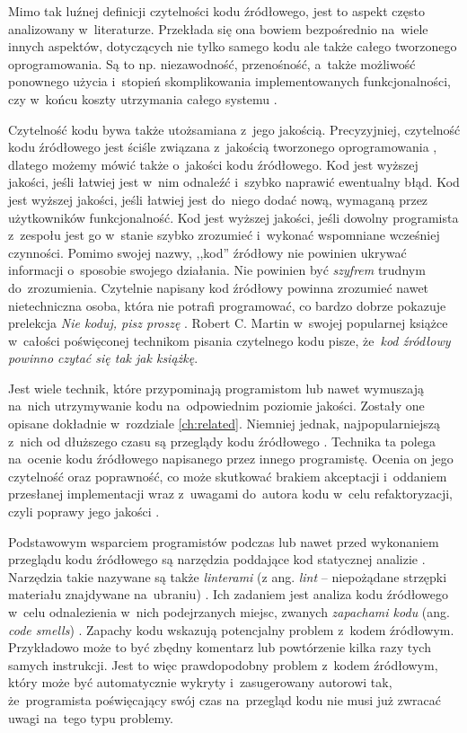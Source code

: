 \documentclass[twoside]{praca}
\begin{document}
Mimo tak luźnej definicji czytelności kodu źródłowego, jest to aspekt często analizowany w~literaturze. Przekłada się ona bowiem bezpośrednio na~wiele innych aspektów, dotyczących nie tylko samego kodu ale także całego tworzonego oprogramowania. Są to np. niezawodność, przenośność, a~także możliwość ponownego użycia i~stopień skomplikowania implementowanych funkcjonalności, czy w~końcu koszty utrzymania całego systemu \cite{collar2006role, tashtoush2013impact}.

Czytelność kodu bywa także utożsamiana z~jego jakością. Precyzyjniej, czytelność kodu źródłowego jest ściśle związana z~jakością tworzonego oprogramowania \cite{buse2010learning}, dlatego możemy mówić także o~jakości kodu źródłowego. Kod jest wyższej jakości, jeśli łatwiej jest w~nim odnaleźć i~szybko naprawić ewentualny błąd. Kod jest wyższej jakości, jeśli łatwiej jest do~niego dodać nową, wymaganą przez użytkowników funkcjonalność. Kod jest wyższej jakości, jeśli dowolny programista z~zespołu jest go w~stanie szybko zrozumieć i~wykonać wspomniane wcześniej czynności. Pomimo swojej nazwy, ,,kod'' źródłowy nie powinien ukrywać informacji o~sposobie swojego działania. Nie powinien być \textit{szyfrem} trudnym do~zrozumienia. Czytelnie napisany kod źródłowy powinna zrozumieć nawet nietechniczna osoba, która nie potrafi programować, co bardzo dobrze pokazuje prelekcja \textit{Nie koduj, pisz proszę} \cite{sobotka:koduj}. Robert C. Martin w~swojej popularnej książce w~całości poświęconej technikom pisania czytelnego kodu \cite{martin2009clean} pisze, że~\textit{kod źródłowy powinno czytać się tak jak książkę}.

Jest wiele technik, które przypominają programistom lub nawet wymuszają na~nich utrzymywanie kodu na~odpowiednim poziomie jakości. Zostały one opisane dokładnie w~rozdziale \ref{ch:related}. Niemniej jednak, najpopularniejszą z~nich od dłuższego czasu są przeglądy kodu źródłowego \cite{beller2014modern}. Technika ta polega na~ocenie kodu źródłowego napisanego przez innego programistę. Ocenia on jego czytelność oraz poprawność, co może skutkować brakiem akceptacji i~oddaniem przesłanej implementacji wraz z~uwagami do~autora kodu w~celu refaktoryzacji, czyli poprawy jego jakości \cite{fowler2018refactoring}.

Podstawowym wsparciem programistów podczas lub nawet przed wykonaniem przeglądu kodu źródłowego są narzędzia poddające kod statycznej analizie \cite{nielson2015principles}. Narzędzia takie nazywane są także \textit{linterami} (z ang. \textit{lint} -- niepożądane strzępki materiału znajdywane na~ubraniu) \cite{wiki:lint, johnson1977lint}. Ich zadaniem jest analiza kodu źródłowego w~celu odnalezienia w~nich podejrzanych miejsc, zwanych \textit{zapachami kodu} (ang. \textit{code smells}) \cite{martin2009clean}. Zapachy kodu wskazują potencjalny problem z~kodem źródłowym. Przykładowo może to być zbędny komentarz lub powtórzenie kilka razy tych samych instrukcji. Jest to więc prawdopodobny problem z~kodem źródłowym, który może być automatycznie wykryty i~zasugerowany autorowi tak, że~programista poświęcający swój czas na~przegląd kodu nie musi już zwracać uwagi na~tego typu problemy.
\end{document}

